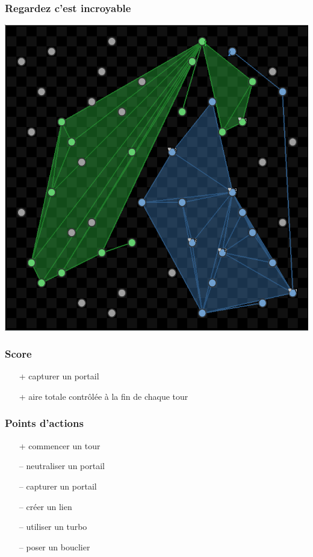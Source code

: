 \documentclass{beamer}
\begin{document}
\begin{frame}
    \begin{center}
        \frametitle{Regardez c'est incroyable}
        \includegraphics[height=0.8\textheight]{gui_full}
    \end{center}
\end{frame}

\begin{frame}
	\frametitle{Score}
	\begin{itemize}
	\item[+] capturer un portail
    \item[+] aire totale contrôlée à la fin de chaque tour
	\end{itemize}
\end{frame}

\begin{frame}
	\frametitle{Points d'actions}
	\begin{itemize}
	\item[+] commencer un tour
	\item[\alert{--}] neutraliser un portail
	\item[\alert{--}] capturer un portail
	\item[\alert{--}] créer un lien
	\item[\alert{--}] utiliser un turbo
	\item[\alert{--}] poser un bouclier
	\end{itemize}
\end{frame}
\end{document}
